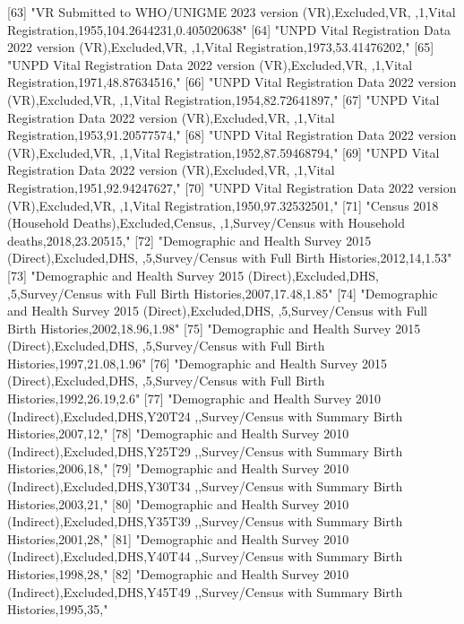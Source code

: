  [63] "VR Submitted to WHO/UNIGME 2023 version (VR),Excluded,VR, ,1,Vital Registration,1955,104.2644231,0.405020638"                 
 [64] "UNPD Vital Registration Data 2022 version (VR),Excluded,VR, ,1,Vital Registration,1973,53.41476202,"                          
 [65] "UNPD Vital Registration Data 2022 version (VR),Excluded,VR, ,1,Vital Registration,1971,48.87634516,"                          
 [66] "UNPD Vital Registration Data 2022 version (VR),Excluded,VR, ,1,Vital Registration,1954,82.72641897,"                          
 [67] "UNPD Vital Registration Data 2022 version (VR),Excluded,VR, ,1,Vital Registration,1953,91.20577574,"                          
 [68] "UNPD Vital Registration Data 2022 version (VR),Excluded,VR, ,1,Vital Registration,1952,87.59468794,"                          
 [69] "UNPD Vital Registration Data 2022 version (VR),Excluded,VR, ,1,Vital Registration,1951,92.94247627,"                          
 [70] "UNPD Vital Registration Data 2022 version (VR),Excluded,VR, ,1,Vital Registration,1950,97.32532501,"                          
 [71] "Census 2018 (Household Deaths),Excluded,Census, ,1,Survey/Census with Household deaths,2018,23.20515,"                        
 [72] "Demographic and Health Survey 2015 (Direct),Excluded,DHS, ,5,Survey/Census with Full Birth Histories,2012,14,1.53"            
 [73] "Demographic and Health Survey 2015 (Direct),Excluded,DHS, ,5,Survey/Census with Full Birth Histories,2007,17.48,1.85"         
 [74] "Demographic and Health Survey 2015 (Direct),Excluded,DHS, ,5,Survey/Census with Full Birth Histories,2002,18.96,1.98"         
 [75] "Demographic and Health Survey 2015 (Direct),Excluded,DHS, ,5,Survey/Census with Full Birth Histories,1997,21.08,1.96"         
 [76] "Demographic and Health Survey 2015 (Direct),Excluded,DHS, ,5,Survey/Census with Full Birth Histories,1992,26.19,2.6"          
 [77] "Demographic and Health Survey 2010 (Indirect),Excluded,DHS,Y20T24 ,,Survey/Census with Summary Birth Histories,2007,12,"      
 [78] "Demographic and Health Survey 2010 (Indirect),Excluded,DHS,Y25T29 ,,Survey/Census with Summary Birth Histories,2006,18,"      
 [79] "Demographic and Health Survey 2010 (Indirect),Excluded,DHS,Y30T34 ,,Survey/Census with Summary Birth Histories,2003,21,"      
 [80] "Demographic and Health Survey 2010 (Indirect),Excluded,DHS,Y35T39 ,,Survey/Census with Summary Birth Histories,2001,28,"      
 [81] "Demographic and Health Survey 2010 (Indirect),Excluded,DHS,Y40T44 ,,Survey/Census with Summary Birth Histories,1998,28,"      
 [82] "Demographic and Health Survey 2010 (Indirect),Excluded,DHS,Y45T49 ,,Survey/Census with Summary Birth Histories,1995,35,"      
